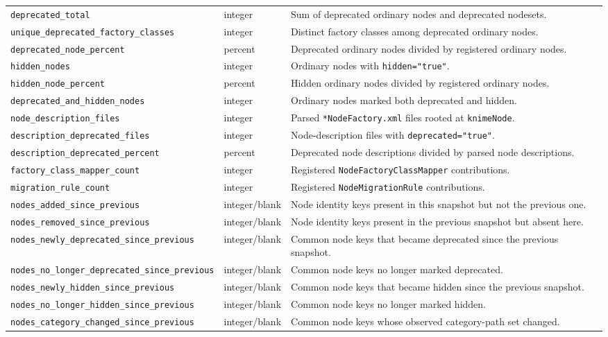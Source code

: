 \documentclass[runningheads]{llncs}
\newcommand{\twolinecol}[2]{\texttt{#1}\newline\texttt{#2}}
\begin{document}
\begin{longtable}{%
  >{\raggedright\arraybackslash}p{}
  >{\raggedright\arraybackslash}p{}
  >{\raggedright\arraybackslash}p{}}
\texttt{deprecated\_total} & integer &
Sum of deprecated ordinary nodes and deprecated nodesets. \\
\twolinecol{unique\_deprecated}{\_factory\_classes} & integer &
Distinct factory classes among deprecated ordinary nodes. \\
\texttt{deprecated\_node\_percent} & percent &
Deprecated ordinary nodes divided by registered ordinary nodes. \\
\texttt{hidden\_nodes} & integer &
Ordinary nodes with \texttt{hidden="true"}. \\
\texttt{hidden\_node\_percent} & percent &
Hidden ordinary nodes divided by registered ordinary nodes. \\
\twolinecol{deprecated\_and}{\_hidden\_nodes} & integer &
Ordinary nodes marked both deprecated and hidden. \\
\texttt{node\_description\_files} & integer &
Parsed \texttt{*NodeFactory.xml} files rooted at \texttt{knimeNode}. \\
\twolinecol{description\_deprecated}{\_files} & integer &
Node-description files with \texttt{deprecated="true"}. \\
\twolinecol{description\_deprecated}{\_percent} & percent &
Deprecated node descriptions divided by parsed node descriptions. \\
\twolinecol{factory\_class\_mapper}{\_count} & integer &
Registered \texttt{NodeFactoryClassMapper} contributions. \\
\texttt{migration\_rule\_count} & integer &
Registered \texttt{NodeMigrationRule} contributions. \\
\twolinecol{nodes\_added}{\_since\_previous} & integer/blank &
Node identity keys present in this snapshot but not the previous one. \\
\twolinecol{nodes\_removed}{\_since\_previous} & integer/blank &
Node identity keys present in the previous snapshot but absent here. \\
\twolinecol{nodes\_newly\_deprecated}{\_since\_previous} & integer/blank &
Common node keys that became deprecated since the previous snapshot. \\
\twolinecol{nodes\_no\_longer\_deprecated}{\_since\_previous} &
integer/blank &
Common node keys no longer marked deprecated. \\
\twolinecol{nodes\_newly\_hidden}{\_since\_previous} & integer/blank &
Common node keys that became hidden since the previous snapshot. \\
\twolinecol{nodes\_no\_longer\_hidden}{\_since\_previous} & integer/blank &
Common node keys no longer marked hidden. \\
\twolinecol{nodes\_category\_changed}{\_since\_previous} & integer/blank &
Common node keys whose observed category-path set changed. \\
\end{longtable}
\endgroup
\end{document}
